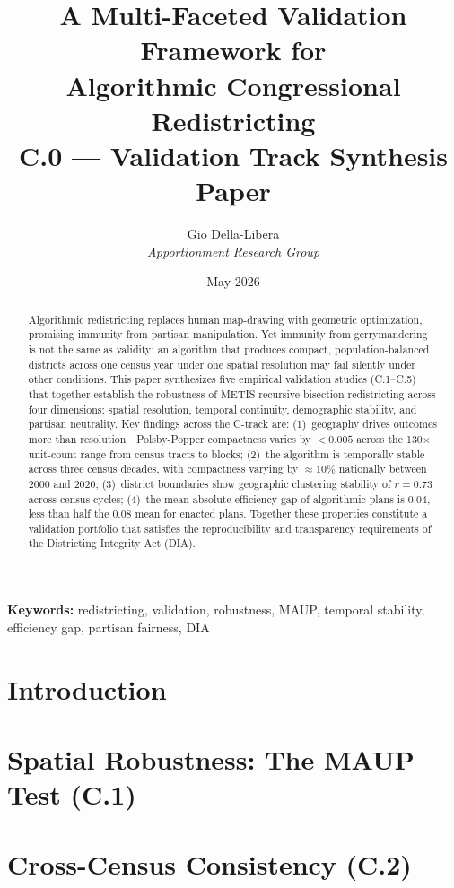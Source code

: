 \documentclass[12pt]{article}
\title{\textbf{A Multi-Faceted Validation Framework for\\
Algorithmic Congressional Redistricting}\\[0.4em]
\large C.0 --- Validation Track Synthesis Paper}
\author{Gio Della-Libera \\ \textit{Apportionment Research Group}}
\date{May 2026}
\begin{document}
\maketitle

\begin{abstract}
Algorithmic redistricting replaces human map-drawing with geometric
optimization, promising immunity from partisan manipulation. Yet
immunity from gerrymandering is not the same as validity: an algorithm
that produces compact, population-balanced districts across one census
year under one spatial resolution may fail silently under other
conditions. This paper synthesizes five empirical validation studies
(C.1--C.5) that together establish the robustness of METIS recursive
bisection redistricting across four dimensions: spatial resolution,
temporal continuity, demographic stability, and partisan neutrality.
Key findings across the C-track are: (1)~geography drives outcomes
more than resolution---Polsby-Popper compactness varies by $< 0.005$
across the 130$\times$ unit-count range from census tracts to blocks;
(2)~the algorithm is temporally stable across three census decades,
with compactness varying by $\approx 10\%$ nationally between 2000 and
2020; (3)~district boundaries show geographic clustering stability of
$r = 0.73$ across census cycles; (4)~the mean absolute efficiency gap
of algorithmic plans is $0.04$, less than half the $0.08$ mean for
enacted plans. Together these properties constitute a validation
portfolio that satisfies the reproducibility and transparency
requirements of the Districting Integrity Act (DIA).
\end{abstract}

\noindent\textbf{Keywords:} redistricting, validation, robustness, MAUP,
temporal stability, efficiency gap, partisan fairness, DIA

\newpage

\section{Introduction}


\section{Spatial Robustness: The MAUP Test (C.1)}
\label{sec:spatial}


\section{Cross-Census Consistency (C.2)}
\label{sec:cross-census}

\end{document}
